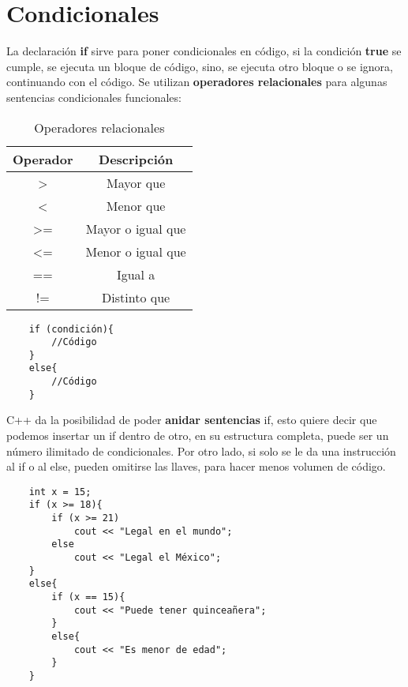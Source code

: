 \section{Condicionales}
\hspace{0.55cm}La declaración \textbf{if} sirve para poner condicionales en código, si la condición \textbf{true} se cumple, se ejecuta un bloque de código, sino, se ejecuta otro bloque o se ignora, continuando con el código. Se utilizan \textbf{operadores relacionales} para algunas sentencias condicionales funcionales:
\begin{table}[H]
    \begin{center}
        \caption{Operadores relacionales}
        \label{tab: 3}
        \begin{tabular}{c c}
            \hline
            \textbf{Operador}&\textbf{Descripción} \\
            \hline
            \textgreater    & Mayor que \\
            \textless       & Menor que \\
            \textgreater =  & Mayor o igual que \\
            \textless =     & Menor o igual que \\
            ==              & Igual a \\
            !=              & Distinto que \\
            \hline
        \end{tabular}
    \end{center}
\end{table}
\begin{lstlisting}
    if (condición){
        //Código
    }
    else{
        //Código
    }
\end{lstlisting}

C++ da la posibilidad de poder \textbf{anidar sentencias} if, esto quiere decir que podemos insertar un if dentro de otro, en su estructura completa, puede ser un número ilimitado de condicionales. Por otro lado, si solo se le da una instrucción al if o al else, pueden omitirse las llaves, para hacer menos volumen de código.
\begin{lstlisting}
    int x = 15;
    if (x >= 18){
        if (x >= 21)
            cout << "Legal en el mundo";
        else
            cout << "Legal el México";
    }
    else{
        if (x == 15){
            cout << "Puede tener quinceañera";
        }
        else{
            cout << "Es menor de edad";
        }
    }
\end{lstlisting}

